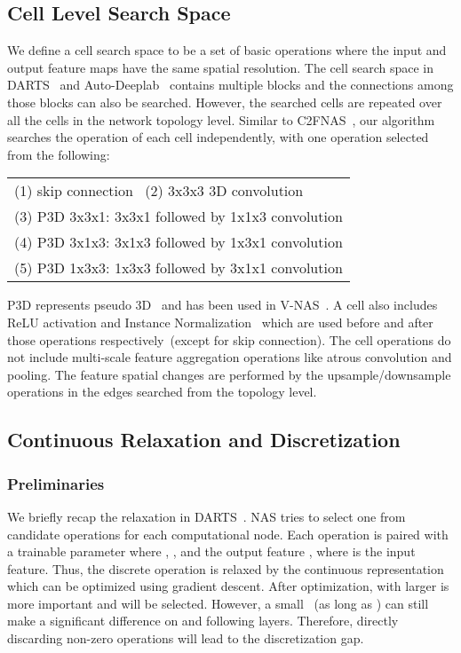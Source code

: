 \documentclass[final]{cvpr}
\begin{document}
\subsection{Cell Level Search Space}
\label{s:cell}
We define a cell search space to be a set of basic operations where the input and output feature maps have the same spatial resolution. The cell search space in DARTS~\cite{liu2018darts} and Auto-Deeplab~\cite{liu2019auto} contains multiple blocks and the connections among those blocks can also be searched. However, the searched cells are repeated over all the cells in the network topology level. Similar to C2FNAS~\cite{yu2020c2fnas}, our algorithm searches the operation of each cell independently, with one operation selected from the following:
\begin{tabular}{l}
    (1) skip connection \quad\quad\quad\, (2) 3x3x3 3D convolution \\
    (3) P3D 3x3x1: 3x3x1 followed by 1x1x3 convolution \\
    (4) P3D 3x1x3: 3x1x3 followed by 1x3x1 convolution \\
    (5) P3D 1x3x3: 1x3x3 followed by 3x1x1 convolution
\end{tabular}
 P3D represents pseudo 3D~\cite{qiu2017p3d} and has been used in V-NAS~\cite{zhu2019vnas}. A cell also includes ReLU activation and Instance Normalization~\cite{ulyanov2016instance} which are used before and after those operations respectively~(except for skip connection). The cell operations do not include multi-scale feature aggregation operations like atrous convolution and pooling. The feature spatial changes are performed by the upsample/downsample operations in the edges searched from the topology level.

\subsection{Continuous Relaxation and Discretization}
\subsubsection{Preliminaries}
\label{s:pre}
 We briefly recap the relaxation in DARTS~\cite{liu2018darts}. NAS tries to select one from  candidate operations  for each computational node. Each operation  is paired with a trainable parameter  where
 , , and the output feature , where  is the input feature. Thus, the discrete operation is relaxed by the continuous representation  which can be optimized using gradient descent. After optimization,   with larger  is more important and will be selected. However, a small ~(as long as ) can still make a significant difference on  and following layers. Therefore, directly discarding non-zero operations will lead to the discretization gap.
\end{document}
